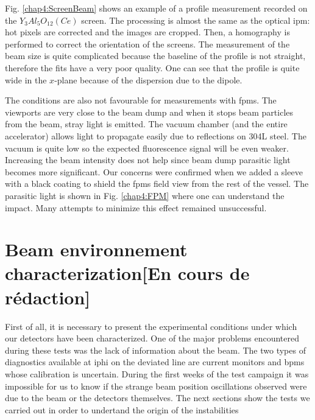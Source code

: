 \begin{refsection}
  Fig. \ref{chap4:ScreenBeam} shows an example of a profile measurement recorded on the $Y_{3}Al_{5}O_{12}(Ce)$ screen. The processing is almost the same as the optical \acrshort{ipm}: hot pixels are corrected and the images are cropped. Then, a homography \cite{szeliski2010,opencv_library} is performed to correct the orientation of the screens. The measurement of the beam size is quite complicated because the baseline of the profile is not straight, therefore the fits have a very poor quality. One can see that the profile is quite wide in the $x$-plane because of the dispersion due to the dipole.

  The conditions are also not favourable for measurements with \acrshort{fpm}s. The viewports are very close to the beam dump and when it stops beam particles from the beam, stray light is emitted. The vacuum chamber (and the entire accelerator) allows light to propagate easily due to reflections on 304L steel. The vacuum is quite low so the expected fluorescence signal will be even weaker. Increasing the beam intensity does not help since beam dump parasitic light becomes more significant.
  Our concerns were confirmed when we added a sleeve with a black coating to shield the \acrshort{fpm}s field view from the rest of the vessel. The parasitic light is shown in Fig. \ref{chap4:FPM} where one can understand the impact. Many attempts to minimize this effect remained unsuccessful.

  

  \section{Beam environnement characterization[En cours de rédaction]}
  First of all, it is necessary to present the experimental conditions under which our detectors have been characterized. One of the major problems encountered during these tests was the lack of information about the beam. The two types of diagnostics available at \acrshort{iphi} on the deviated line are current monitors and \acrshort{bpm}s whose calibration is uncertain. During the first weeks of the test campaign it was impossible for us to know if the strange beam position oscillations observed were due to the beam or the detectors themselves. The next sections show the tests we carried out in order to undertand the origin of the instabilities


\end{refsection}
